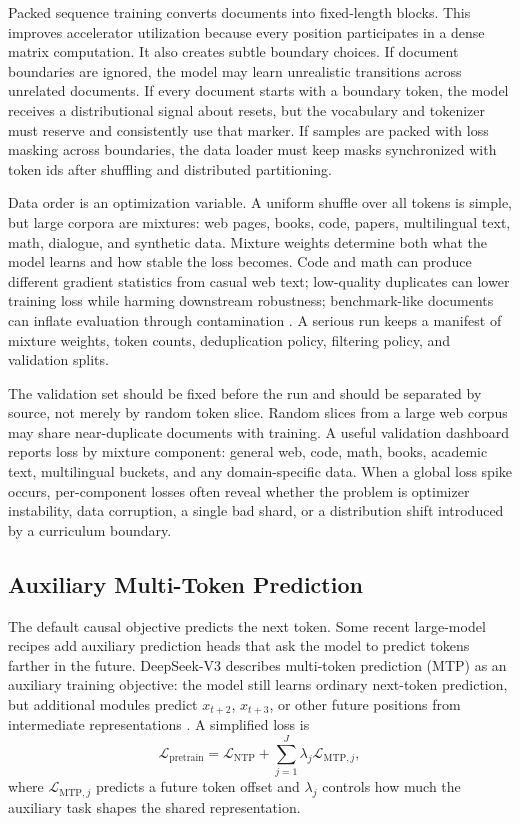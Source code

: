 Packed sequence training converts documents into fixed-length blocks. This improves accelerator utilization because every position participates in a dense matrix computation. It also creates subtle boundary choices. If document boundaries are ignored, the model may learn unrealistic transitions across unrelated documents. If every document starts with a boundary token, the model receives a distributional signal about resets, but the vocabulary and tokenizer must reserve and consistently use that marker. If samples are packed with loss masking across boundaries, the data loader must keep masks synchronized with token ids after shuffling and distributed partitioning.

Data order is an optimization variable. A uniform shuffle over all tokens is simple, but large corpora are mixtures: web pages, books, code, papers, multilingual text, math, dialogue, and synthetic data. Mixture weights determine both what the model learns and how stable the loss becomes. Code and math can produce different gradient statistics from casual web text; low-quality duplicates can lower training loss while harming downstream robustness; benchmark-like documents can inflate evaluation through contamination \cite{shi2023detecting,xu2024benchmark}. A serious run keeps a manifest of mixture weights, token counts, deduplication policy, filtering policy, and validation splits.

The validation set should be fixed before the run and should be separated by source, not merely by random token slice. Random slices from a large web corpus may share near-duplicate documents with training. A useful validation dashboard reports loss by mixture component: general web, code, math, books, academic text, multilingual buckets, and any domain-specific data. When a global loss spike occurs, per-component losses often reveal whether the problem is optimizer instability, data corruption, a single bad shard, or a distribution shift introduced by a curriculum boundary.

\subsection{Auxiliary Multi-Token Prediction}
The default causal objective predicts the next token. Some recent large-model recipes add auxiliary prediction heads that ask the model to predict tokens farther in the future. DeepSeek-V3 describes multi-token prediction (MTP) as an auxiliary training objective: the model still learns ordinary next-token prediction, but additional modules predict $x_{t+2}$, $x_{t+3}$, or other future positions from intermediate representations \cite{deepseek2024v3}. A simplified loss is
\[
  \mathcal{L}_{\mathrm{pretrain}}
  =
  \mathcal{L}_{\mathrm{NTP}}
  +
  \sum_{j=1}^{J}\lambda_j
  \mathcal{L}_{\mathrm{MTP},j},
\]
where $\mathcal{L}_{\mathrm{MTP},j}$ predicts a future token offset and $\lambda_j$ controls how much the auxiliary task shapes the shared representation.

